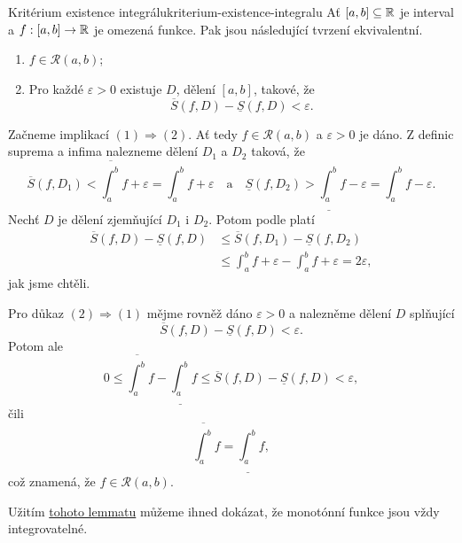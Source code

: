 \begin{lemma}{Kritérium existence integrálu}{kriterium-existence-integralu}
 Ať $[a,b] \subseteq \mathbb{R}$ je interval a $f:[a,b] \to \mathbb{R}$ je omezená funkce. Pak
 jsou následující tvrzení ekvivalentní.
 \begin{enumerate}
  \item $f \in \mathcal{R}(a,b)$;
  \item Pro každé $\varepsilon>0$ existuje $D$, dělení $[a,b]$, takové, že
  \[
   \overline{S}(f,D) - \underline{S}(f,D) < \varepsilon.
  \]
 \end{enumerate}
\end{lemma}
\begin{lemproof}
 Začneme implikací $(1) \Rightarrow (2)$. Ať tedy $f \in \mathcal{R}(a,b)$ a
 $\varepsilon>0$ je dáno. Z definic suprema a infima nalezneme dělení $D_1$ a
 $D_2$ taková, že
 \[
  \overline{S}(f,D_1) < \overline{\int_{a}^{b}} f + \varepsilon = \int_{a}^{b} f
  + \varepsilon \quad \text{a} \quad \underline{S}(f,D_2) >
  \underline{\int_{a}^{b}} f - \varepsilon = \int_{a}^{b} f - \varepsilon.
 \]
 Nechť $D$ je dělení zjemňující $D_1$ i $D_2$. Potom podle
  platí
 \begin{align*}
  \overline{S}(f,D) - \underline{S}(f,D) &\leq \overline{S}(f,D_1) -
  \underline{S}(f,D_2)\\
                                         & \leq \int_{a}^{b} f + \varepsilon -
                                         \int_{a}^{b} f + \varepsilon =
                                         2\varepsilon,
 \end{align*}
 jak jsme chtěli.

 Pro důkaz $(2) \Rightarrow (1)$ mějme rovněž dáno $\varepsilon>0$ a nalezněme
 dělení $D$ splňující
 \[
  \overline{S}(f,D) - \underline{S}(f,D) < \varepsilon.
 \]
 Potom ale
 \[
  0 \leq \overline{\int_{a}^{b}} f - \underline{\int_{a}^{b}} f \leq
  \overline{S}(f,D) - \underline{S}(f,D) < \varepsilon,
 \]
 čili
 \[
  \overline{\int_{a}^{b}} f = \underline{\int_{a}^{b}} f,
 \]
 což znamená, že $f \in \mathcal{R}(a,b)$.
\end{lemproof}

Užitím \hyperref[lem:kriterium-existence-integralu]{tohoto lemmatu} můžeme ihned
dokázat, že monotónní funkce jsou vždy integrovatelné.

